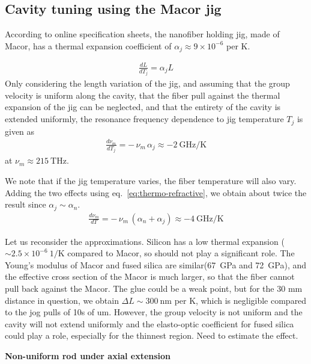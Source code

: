 \documentclass[aps,pra, onecolumn,superscriptaddress,nopacs,floatfix, showkeys, notitlepage]{revtex4-1}
\begin{document}
\subsection{Cavity tuning using the Macor jig}
According to online specification sheets, the nanofiber holding jig, made of Macor, has a thermal expansion coefficient of $\alpha_j \approx 9\times10^{-6}$ per K.

\begin{eqnarray}
    \frac{dL}{dT_j} = \alpha_j L
\end{eqnarray}
Only considering the length variation of the jig, and assuming that the group velocity is uniform along the cavity, that the fiber pull against the thermal expansion of the jig can be neglected, and that the entirety of the cavity is extended uniformly, the resonance frequency dependence to jig temperature $T_j$ is given as
\begin{eqnarray}
\frac{d\nu_m}{dT_j}
= -\,\nu_m\,\alpha_j \approx -2~\mathrm{GHz/K}
\end{eqnarray}
at $\nu_m \approx 215~\mathrm{THz}$.

We note that if the jig temperature varies, the fiber temperature will also vary. Adding the two effects using eq.~\ref{eq:thermo-refractive}, we obtain about twice the result since $\alpha_j \sim \alpha_n$.
\begin{eqnarray}
\frac{d\nu_m}{dT}
= -\,\nu_m\,(\alpha_n + \alpha_j)\approx -4~\mathrm{GHz/K}
\end{eqnarray}

Let us reconsider the approximations. Silicon has a low thermal expansion ($\sim 2.5\times10^{-6} ~\mathrm{1/K}$ compared to Macor, so should not play a significant role. The Young's modulus of Macor and fused silica are similar(67~GPa and 72~GPa), and the effective cross section of the Macor is much larger, so that the fiber cannot pull back against the Macor. The glue could be a weak point, but for the 30 mm distance in question, we obtain $\Delta L \sim 300~\mathrm{nm}$ per K, which is negligible compared to the jog pulls of 10s of um.
However, the group velocity is not uniform and the cavity will not extend uniformly and the elasto-optic coefficient for fused silica could play a role, especially for the thinnest region. Need to estimate the effect.

\textbf{Non-uniform rod under axial extension}
\end{document}
